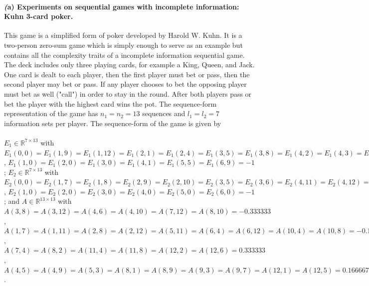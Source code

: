 \documentclass{article} %
\begin{document}
\paragraph{\textit(a) Experiments on sequential games with incomplete
  information: Kuhn 3-card
  poker.} This game is a simplified form of poker
developed by Harold W. Kuhn. It is a two-person zero-sum game which is
simply enough to serve as an example but contains all the complexity
traits of a incomplete information sequential game. The
deck includes only three playing cards, for example a King, Queen, and
Jack. One card is dealt to each player, then the first player must bet
or pass, then the second player may bet or pass. If any player chooses
to bet the opposing player must bet as well ("call") in order to stay
in the round. After both players pass or bet the player with the
highest card wins the pot. The
sequence-form representation of the game has $n_1 = n_2 = 13$
sequences and $l_1 = l_2 = 7$ information
sets per player. The sequence-form of the game is given by\\\\
$E_1 \in \mathbb{R}^{7 \times 13}$ with $E_1(0,0) = E_1(1,9) =
E_1(1,12) = E_1(2,1) = E_1(2,4) = E_1(3,5) =
E_1(3,8) = E_1(4,2) = E_1(4,3) = E_1(5,6) = E_1(5,7) = E_1(6,10) =
E_1(6,11) = {1}$, $E_1(1,0) = E_1(2,0) = E_1(3,0) = E_1(4,1) =
E_1(5,5) = E_1(6,9) = {-1}$; $E_2 \in \mathbb{R}^{7 \times 13}$ with
$E_2(0,0) = E_2(1,7) = E_2(1,8) = E_2(2,9) = E_2(2,10) = E_2(3,5) =
E_2(3,6) = E_2(4,11) = E_2(4,12) = E_2(5,1) = E_2(5,2) = E_2(6,3) =
E_2(6,4) = {1}$, $E_2(1,0) = E_2(2,0) = E_2(3,0) = E_2(4,0) =
E_2(5,0) = E_2(6,0) = {-1}$; and $A \in \mathbb{R}^{13 \times
  13}$ with $A(3,8) = A(3,12) = A(4,6) = A(4,10) = A(7,12) = A(8,10) =
{-0.333333}$, $A(1,7) = A(1,11) = A(2,8) = A(2,12) = A(5,11) =
A(6,4) = A(6,12) = A(10,4) = A(10,8) = {-0.166667}$, $A(7,4) =
A(8,2) = A(11,4) = A(11,8) = A(12,2) = A(12,6) = {0.333333}$,
$A(4,5) = A(4,9) = A(5,3) = A(8,1) = A(8,9) = A(9,3) = A(9,7) =
A(12,1) = A(12,5) = {0.166667}$.\\
\end{document}
